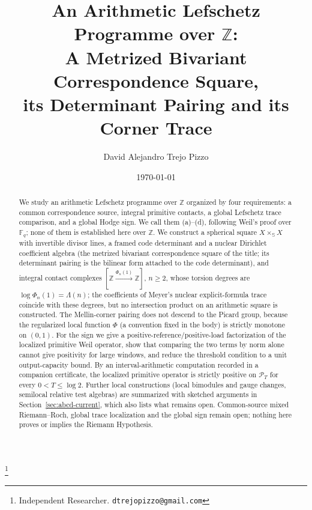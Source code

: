 \documentclass[11pt]{amsart}
\theoremstyle{definition}
\theoremstyle{remark}
\newcommand{\Z}{\mathbb Z}
\begin{document}
\title[An arithmetic Lefschetz programme over $\Z$]
{An Arithmetic Lefschetz Programme over $\Z$:\\
A Metrized Bivariant Correspondence Square,\\
its Determinant Pairing and its Corner Trace}

\author{David Alejandro Trejo Pizzo}
\thanks{Independent Researcher. \texttt{dtrejopizzo@gmail.com}}

\date{\today}

\begin{abstract}
We study an arithmetic Lefschetz programme over $\Z$ organized by four
requirements: a common correspondence source, integral primitive contacts,
a global Lefschetz trace comparison, and a global Hodge sign. We call them
(a)--(d), following Weil's proof over $\mathbb F_q$; none of them is
established here over $\Z$. We construct a spherical square $X\times_{\mathbb S}X$ with invertible
divisor lines, a framed code determinant and a nuclear Dirichlet coefficient
algebra (the metrized bivariant correspondence square of the title; its
determinant pairing is the bilinear form attached to the code determinant),
and integral contact complexes $[\Z\xrightarrow{\Phi_n(1)}\Z]$, $n\ge2$,
whose torsion degrees are
$\log\Phi_n(1)=\Lambda(n)$; the coefficients of Meyer's nuclear
explicit-formula trace coincide with these degrees, but no intersection
product on an arithmetic square is constructed. The Mellin-corner pairing
does not descend to the Picard group, because the regularized local function
$\Phi$ (a convention fixed in the body) is strictly monotone on $(0,1)$. For the sign we give a positive-reference/positive-load
factorization of the localized primitive Weil operator, show that comparing
the two terms by norm alone cannot give positivity for large windows, and
reduce the threshold condition to a unit output-capacity bound. By an
interval-arithmetic computation recorded in a companion certificate, the
localized primitive operator is strictly positive on $\mathcal P_T$ for
every $0<T\le\log2$. Further local constructions (local bimodules and
gauge changes, semilocal relative test algebras) are summarized with sketched arguments in Section~\ref{sec:abcd-current}, which
also lists what remains open. Common-source mixed Riemann--Roch, global
trace localization and the global sign remain open; nothing here proves or
implies the Riemann Hypothesis.
\end{abstract}


\maketitle
\end{document}
